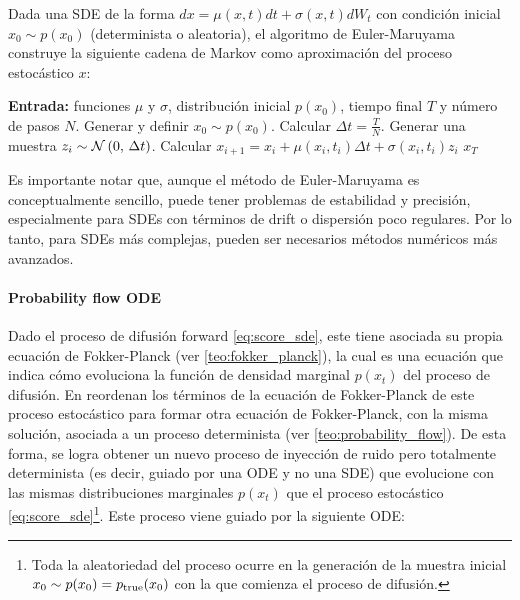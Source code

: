 Dada una SDE de la forma $dx = \mu(x,t)dt + \sigma(x,t)dW_t$ con condición inicial $x_0\sim p(x_0)$ (determinista o aleatoria), el algoritmo de Euler-Maruyama construye la siguiente cadena de Markov como aproximación del proceso estocástico $x$:

\begin{algorithm}
    \caption{Euler-Maruyama}
    \label{alg:euler-maruyama}
    \begin{algorithmic}[1]
        \State \textbf{Entrada:} funciones $\mu$ y $\sigma$, distribución inicial $p(x_0)$, tiempo final $T$ y número de pasos $N$.
        \State Generar y definir $x_0\sim p(x_0)$.
        \State Calcular $\Delta t = \frac{T}{N}$.
        \State Generar una muestra $z_i\sim\mathcal{N}\left(0,\,\Delta t\right)$.
        \State Calcular $x_{i+1} = x_i + \mu(x_i, t_i) \Delta t + \sigma(x_i, t_i) z_i$
        \EndFor
        \State \Return $x_T$
    \end{algorithmic}
\end{algorithm}

Es importante notar que, aunque el método de Euler-Maruyama es conceptualmente sencillo, puede tener problemas de estabilidad y precisión, especialmente para SDEs con términos de drift o dispersión poco regulares. Por lo tanto, para SDEs más complejas, pueden ser necesarios métodos numéricos más avanzados.

\paragraph{Probability flow ODE}

Dado el proceso de difusión forward \eqref{eq:score_sde}, este tiene asociada su propia ecuación de Fokker-Planck (ver \autoref{teo:fokker_planck}), la cual es una ecuación que indica cómo evoluciona la función de densidad marginal $p(x_t)$ del proceso de difusión. En \cite{song2021scorebased} reordenan los términos de la ecuación de Fokker-Planck de este proceso estocástico para formar otra ecuación de Fokker-Planck, con la misma solución, asociada a un proceso determinista (ver \autoref{teo:probability_flow}). De esta forma, se logra obtener un nuevo proceso de inyección de ruido pero totalmente determinista (es decir, guiado por una ODE y no una SDE) que evolucione con las mismas distribuciones marginales $p(x_t)$ que el proceso estocástico \eqref{eq:score_sde}\footnote{Toda la aleatoriedad del proceso ocurre en la generación de la muestra inicial $x_0\sim p(x_0)=p_{\operatorname{true}}(x_0)$ con la que comienza el proceso de difusión.}. Este proceso viene guiado por la siguiente ODE:


